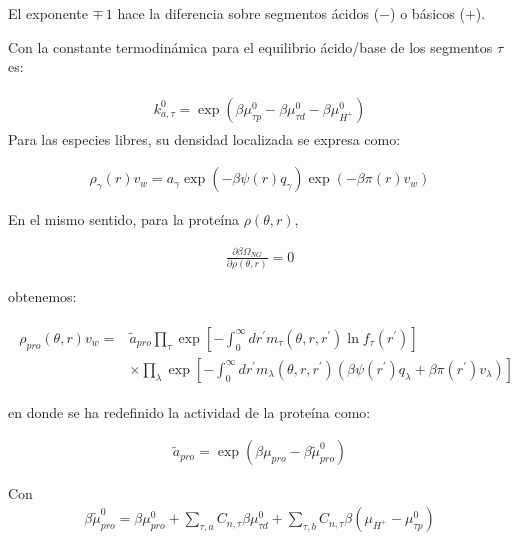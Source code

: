  El exponente $\mp \, 1$ hace la diferencia sobre segmentos \'acidos ($-$) o b\'asicos ($+$).

Con la constante termodin\'amica para el equilibrio \'acido/base de los segmentos $\tau$ es:

\begin{align}
	\begin{aligned}
		k_{a,\tau}^0=\exp\left(\beta\mu_{\tau p}^0 - \beta \mu_{\tau d}^0 - \beta \mu^0_{H^+} \right)
	\end{aligned}
	\label{eq:esf:distau-rxn}
\end{align}
Para las especies libres, su densidad localizada se expresa como:


\begin{align}
	\rho_\gamma(r)v_w = a_\gamma \exp{\left(-\beta \psi(r)q_\gamma\right)} \exp{\left(-\beta\pi(r) v_w\right)}
		\label{eq:esf:rho-libres}
\end{align}


En el mismo sentido, para la prote\'ina $\rho(\theta,r)$,

\begin{align}
	\frac{\partial \beta \Omega_{NG}}{\partial \rho(\theta,r)} = 0
\end{align}

 obtenemos:
	

\begin{align}
	\begin{aligned}
		\rho_{pro}(\theta, r)v_w = & \tilde{a}_{pro} \prod_\tau \exp\left[ -\int_0^\infty dr^\prime  m_\tau(\theta,r,r^\prime) \ln f_\tau(r^\prime)\right] \\
		& \times \prod_\lambda \exp\left[ -\int_0^\infty dr^\prime  m_\lambda(\theta,r,r^\prime)\left( \beta\psi(r^\prime) q_\lambda + \beta \pi(r^\prime) v_\lambda \right)\right]
	\end{aligned}
	\label{eq:esf:rho-pro}
\end{align}
	
	\noindent en donde se ha redefinido la actividad de la prote\'ina como:
	
	\begin{align}
		\tilde{a}_{pro} = \exp\left(\beta\mu_{pro} - \beta\tilde{\mu}^0_{pro}\right)
	\end{align}

Con
\begin{align}
	\beta\tilde{\mu}^0_{pro} =  \beta \mu^0_{pro}  + \sum_{\tau,a} C_{n,\tau}\beta\mu^0_{\tau d} 
	+ \sum_{\tau,b} C_{n,\tau}\beta(\mu_{H^+} - \mu^0_{\tau p})
\end{align}



